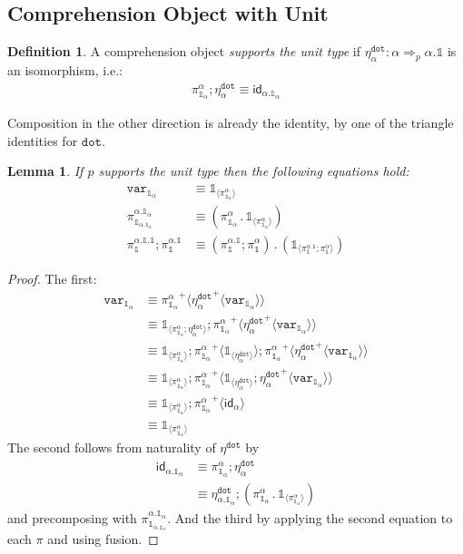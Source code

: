 \documentclass[10pt]{article}
\newtheorem{lemma}{Lemma}
\theoremstyle{definition}
\newtheorem{definition}{Definition}
\newcommand{\tcell}{\Rightarrow}
\newcommand{\id}{\mathsf{id}}
\newcommand\bdot[0]{\mathbin{.}}
\newcommand\ApPlus[2]{\ensuremath{{#1}^+ \langle #2 \rangle }}
\newcommand{\tdot}{\ensuremath{\mathtt{dot}}}
\newcommand\One{\ensuremath{\mathds{1}}}
\newcommand\var[1]{\ensuremath{\mathtt{var}_{#1}}}
\newcommand\ApOne[1]{\ensuremath{\One_{\langle {#1} \rangle }}}
\begin{document}
\subsection{Comprehension Object with Unit}

\begin{definition}
A comprehension object \emph{supports the unit type} if $\eta^\tdot_\alpha : \alpha \tcell_p \alpha.\One$ is an isomorphism, i.e.:
\begin{align}
\pi^\alpha_{\One_\alpha} ; \eta^\tdot_\alpha \equiv \id_{\alpha.\One_\alpha}
\end{align}
\end{definition}
Composition in the other direction is already the identity, by one of the triangle identities for $\tdot$.

\begin{lemma}
If $p$ supports the unit type then the following equations hold:
\begin{align}
\var{\One_\alpha} &\equiv \ApOne{\pi^\alpha_{\One_\alpha}} \\
\pi^{\alpha.\One_\alpha}_{\One_{\alpha.\One_\alpha}} &\equiv (\pi^\alpha_{\One_\alpha} \bdot \ApOne{\pi^\alpha_{\One_\alpha}}) \\
\pi^{\alpha.\One.\One}_\One;\pi^{\alpha.\One}_\One &\equiv (\pi^{\alpha.\One}_\One;\pi^{\alpha}_\One) \bdot (\ApOne{\pi^{\alpha.\One}_\One;\pi^{\alpha}_\One})
\end{align}
\end{lemma}
\begin{proof}
The first:
\begin{align*}
\var{\One_\alpha} 
&\equiv \ApPlus{\pi^\alpha_{\One_\alpha}}{\ApPlus{\eta^\tdot_\alpha}{\var{\One_\alpha}}} \\
&\equiv \ApOne{\pi^\alpha_{\One_\alpha} ; \eta^\tdot_\alpha};\ApPlus{\pi^\alpha_{\One_\alpha}}{\ApPlus{\eta^\tdot_\alpha}{\var{\One_\alpha}}} \\
&\equiv \ApOne{\pi^\alpha_{\One_\alpha}};\ApPlus{\pi^\alpha_{\One_\alpha}}{\ApOne{\eta^\tdot_\alpha}};\ApPlus{\pi^\alpha_{\One_\alpha}}{\ApPlus{\eta^\tdot_\alpha}{\var{\One_\alpha}}} \\
&\equiv \ApOne{\pi^\alpha_{\One_\alpha}};\ApPlus{\pi^\alpha_{\One_\alpha}}{\ApOne{\eta^\tdot_\alpha};\ApPlus{\eta^\tdot_\alpha}{\var{\One_\alpha}}} \\
&\equiv \ApOne{\pi^\alpha_{\One_\alpha}};\ApPlus{\pi^\alpha_{\One_\alpha}}{\id_{\alpha}} \\
&\equiv \ApOne{\pi^\alpha_{\One_\alpha}}
\end{align*}
The second follows from naturality of $\eta^\tdot$ by
\begin{align*}
\id_{\alpha.\One_\alpha} 
&\equiv \pi^\alpha_{\One_\alpha} ; \eta^\tdot_\alpha \\
&\equiv \eta^\tdot_{\alpha.\One_\alpha} ; (\pi^\alpha_{\One_\alpha} \bdot \ApOne{\pi^\alpha_{\One_\alpha}})
\end{align*}
and precomposing with $\pi^{\alpha.\One_\alpha}_{\One_{\alpha.\One_\alpha}}$.
And the third by applying the second equation to each $\pi$ and using fusion.
\end{proof}
\end{document}
